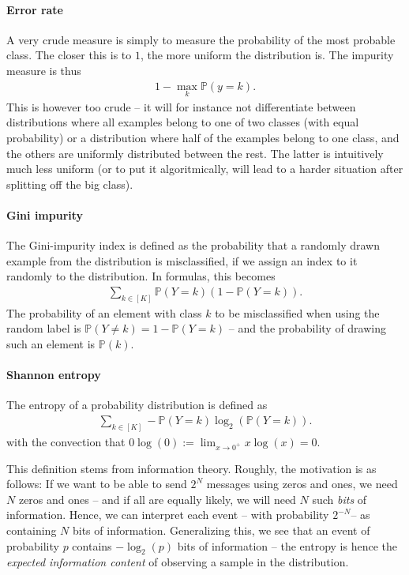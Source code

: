 \documentclass{article}
\begin{document}
\paragraph{Error rate} A very crude measure is simply to measure the probability of the most probable class. The closer this is to $1$, the more uniform the distribution is. The impurity measure is thus
\begin{align*}
    1 - \max_k \mathbb{P}(y=k).
\end{align*}
This is however too crude -- it will for instance not differentiate between distributions where all examples belong to one of two classes (with equal probability) or a distribution where half of the examples belong to one class, and the others are uniformly distributed between the rest. The latter is intuitively much less uniform (or to put it algoritmically, will lead to a harder situation after splitting off the big class).

\paragraph{Gini impurity} The Gini-impurity index is defined as the probability that a randomly drawn example from the distribution is misclassified, if we assign an index to it randomly to the distribution. In formulas, this becomes
\begin{align*}
    \sum_{k \in [K]} \mathbb{P}(Y=k)(1-\mathbb{P}(Y=k)).
\end{align*}
The probability of an element with class $k$ to be misclassified when using the random label is $\mathbb{P}(Y\neq k)=1-\mathbb{P}(Y=k)$ -- and the probability of drawing such an element is $\mathbb{P}(k)$.

\paragraph{Shannon entropy} The entropy of a probability distribution is defined as 
\begin{align*}
    \sum_{k \in [K]} -\mathbb{P}(Y=k)\log_2(\mathbb{P}(Y=k)).
\end{align*}
with the convection that $0\log(0) :=\lim_{x\to 0^+}x\log(x)=0$.

This definition stems from information theory. Roughly, the motivation is as follows: If we want to be able to send $2^N$ messages using zeros and ones, we need $N$ zeros and ones -- and if all are equally likely, we will need $N$ such \emph{bits} of information. Hence, we can interpret each event -- with probability $2^{-N}$-- as containing $N$ bits of information. Generalizing this, we see that an event of probability $p$ contains $-\log_2(p)$ bits of information -- the entropy is hence the \emph{expected information content} of observing a sample in the distribution.
\end{document}
